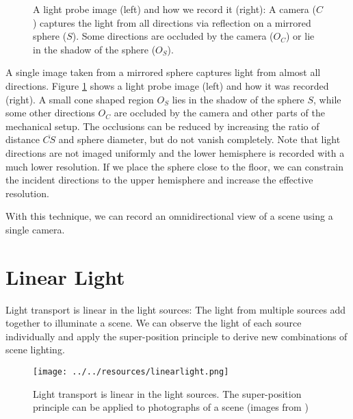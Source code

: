  
  \begin{figure}[h]
   
  \captionsetup[subfigure]{labelformat=empty}
    \hfill
    
   \caption[Recording light probe images]{A light probe image (left) and how we record it (right): A camera ($C$) captures the light from all directions via reflection on
    a mirrored sphere ($S$). Some directions are occluded by the camera ($O_C$) or lie in the shadow of the sphere ($O_S$).  }
    
   \label{fig:sphere_mapping}
  \end{figure}
 
 A single image taken from a mirrored sphere captures light from almost all directions.
 Figure \ref{fig:sphere_mapping} shows a light probe image (left) and how it was recorded (right).
  A small cone shaped region $O_S$ lies in the shadow of the sphere $S$, while some other directions $O_C$ are occluded by the camera and other parts of the mechanical setup.
 The occlusions can be reduced by increasing the ratio of distance $\overline{CS}$ and sphere diameter, but do not vanish completely.
 Note that light directions are not imaged uniformly and the lower hemisphere is recorded with a much lower resolution. 
 If we place the sphere close to the floor, we can constrain the incident directions to the upper hemisphere and increase the effective resolution.

 With this technique, we can record an omnidirectional view of a scene using a single camera. 

\section{Linear Light}
\label{sec:linearlight}

 
 Light transport is linear in the light sources: The light from multiple sources add together to illuminate a scene.
 We can observe the light of each source individually and apply the super-position principle to derive new combinations of scene lighting.
 
  \begin{figure}[H]
   \center
   \texttt{[image: ../../resources/linearlight.png]}
   \caption[Linear light example]{Light transport is linear in the light sources. The super-position principle can be applied to photographs of a scene (images from \cite{HAEBERLI}) }
   \label{fig:linearlight}
  \end{figure}
 
